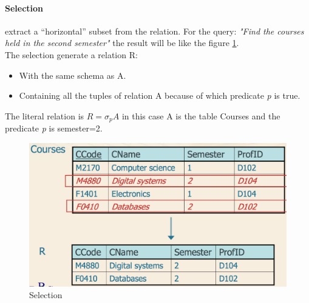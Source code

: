 \documentclass[12pt]{article}
\begin{document}
\paragraph{Selection} extract a ``horizontal'' subset from the relation. For the query: \textit{"Find the courses held in the second semester"} the result will be like the figure \ref{fig:select}.\\
The selection generate a relation R:
\begin{itemize}
  \item With the same schema as A.
  \item Containing all the tuples of relation A because of which predicate \textit{p} is true.
\end{itemize}
The literal relation is $R=\sigma_{p}A$ in this case A is the table Courses and the predicate \textit{p} is semester=2.
\begin{figure}[H]
  \includegraphics[width=\textwidth]{images/select.png}
  \caption{Selection}
  \label{fig:select}
\end{figure}
\end{document}
